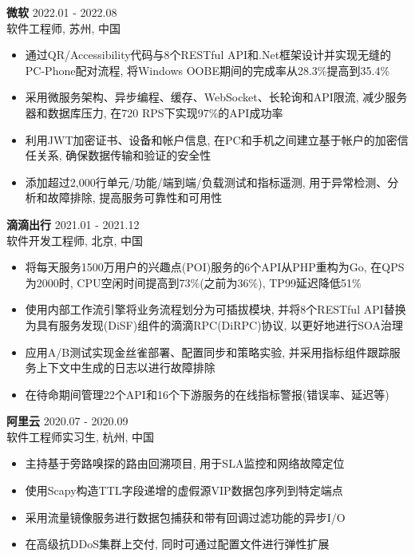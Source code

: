 \documentclass[10pt,a4paper]{article}
\begin{document}
\noindent\textbf{微软} \hfill 2022.01 - 2022.08\\
软件工程师, 苏州, 中国\vspace{-8pt}
\begin{itemize}[noitemsep,leftmargin = 15pt]
    \item 通过QR/Accessibility代码与8个RESTful API和.Net框架设计并实现无缝的PC-Phone配对流程, 将Windows OOBE期间的完成率从28.3\%提高到35.4\%
    \item 采用微服务架构、异步编程、缓存、WebSocket、长轮询和API限流, 减少服务器和数据库压力, 在720 RPS下实现97\%的API成功率
    \item 利用JWT加密证书、设备和帐户信息, 在PC和手机之间建立基于帐户的加密信任关系, 确保数据传输和验证的安全性
    \item 添加超过2,000行单元/功能/端到端/负载测试和指标遥测, 用于异常检测、分析和故障排除, 提高服务可靠性和可用性
\end{itemize}

\newpage
\noindent\textbf{滴滴出行} \hfill 2021.01 - 2021.12\\
软件开发工程师, 北京, 中国\vspace{-8pt}
\begin{itemize}[noitemsep]
    \item 将每天服务1500万用户的兴趣点(POI)服务的6个API从PHP重构为Go, 在QPS为2000时, CPU空闲时间提高到73\%(之前为36\%), TP99延迟降低51\%
    \item 使用内部工作流引擎将业务流程划分为可插拔模块, 并将8个RESTful API替换为具有服务发现(DiSF)组件的滴滴RPC(DiRPC)协议, 以更好地进行SOA治理
    \item 应用A/B测试实现金丝雀部署、配置同步和策略实验, 并采用指标组件跟踪服务上下文中生成的日志以进行故障排除
    \item 在待命期间管理22个API和16个下游服务的在线指标警报(错误率、延迟等)
\end{itemize}

\noindent\textbf{阿里云} \hfill 2020.07 - 2020.09\\
软件工程师实习生, 杭州, 中国\vspace{-8pt}
\begin{itemize}[noitemsep]
    \item 主持基于旁路嗅探的路由回溯项目, 用于SLA监控和网络故障定位
    \item 使用Scapy构造TTL字段递增的虚假源VIP数据包序列到特定端点
    \item 采用流量镜像服务进行数据包捕获和带有回调过滤功能的异步I/O
    \item 在高级抗DDoS集群上交付, 同时可通过配置文件进行弹性扩展
\end{itemize}
\end{document}
